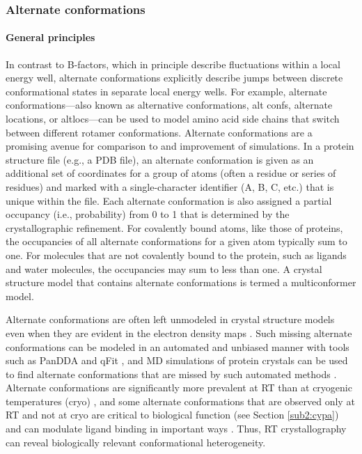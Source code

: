 \documentclass[9pt,review,pubversion]{livecoms}
\begin{document}
\subsubsection{Alternate conformations}
\label{sub2:alt_confs}

\paragraph{General principles}

In contrast to B-factors, which in principle describe fluctuations within a local energy well, alternate conformations explicitly describe jumps between discrete conformational states in separate local energy wells.
For example, alternate conformations---also known as alternative conformations, alt confs, alternate locations, or altlocs---can be used to model amino acid side chains that switch between different rotamer \cite{dunbrack_backbone-dependent_1993,lovell_penultimate_2000} conformations.
Alternate conformations are a promising avenue for comparison to and improvement of simulations.
In a protein structure file (e.g., a PDB file), an alternate conformation is given as an additional set of coordinates for a group of atoms (often a residue or series of residues) and marked with a single-character identifier (A, B, C, etc.) that is unique within the file.
Each alternate conformation is also assigned a partial occupancy (i.e., probability) from 0 to 1 that is determined by the crystallographic refinement.
For covalently bound atoms, like those of proteins, the occupancies of all alternate conformations for a given atom typically sum to one.
For molecules that are not covalently bound to the protein, such as ligands and water molecules, the occupancies may sum to less than one.
A crystal structure model that contains alternate conformations is termed a multiconformer model.

Alternate conformations are often left unmodeled in crystal structure models even when they are evident in the electron density maps \cite{lang_automated_2010}.
Such missing alternate conformations can be modeled in an automated and unbiased manner with tools such as PanDDA \cite{pearce_multi-crystal_2017} and qFit \cite{riley_qfit_2021,wankowicz_automated_2024}, and MD simulations of protein crystals can be used to find alternate conformations that are missed by such automated methods \cite{wych_molecular-dynamics_2023}.
Alternate conformations are significantly more prevalent at RT than at cryogenic temperatures (cryo) \cite{fraser_accessing_2011}, and some alternate conformations that are observed only at RT and not at cryo are critical to biological function \cite{fraser_hidden_2009} (see Section \ref{sub2:cypa}) and can modulate ligand binding in important ways \cite{bradford_temperature_2021}.
Thus, RT crystallography can reveal biologically relevant conformational heterogeneity.
\end{document}
